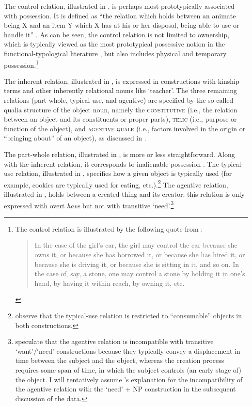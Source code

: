 \documentclass[output=paper,colorlinks,citecolor=brown]{langscibook}
\begin{document}
The control relation, illustrated in , is perhaps most prototypically associated with possession. It is defined as ``\label{ViknerJensen-control}the relation which holds between an animate being X and an item Y which X has at his or her disposal, being able to use or handle it'' \citep[196--197]{Vikner.Jensen2002}. As can be seen, the control relation is not limited to ownership, which is typically viewed as the most prototypical possessive notion in the functional-typological literature \citep[see, e.g.,][]{Heine1997}, but also includes physical and temporary possession.\footnote{The control relation is illustrated by the following quote from \citeauthor{Vikner.Jensen2002}:
\begin{quote}In the case of the girl's car, the girl may control the car because she owns it, or because she has borrowed it, or because she has hired it, or because she is driving it, or because she is sitting in it, and so on. In the case of, say, a stone, one may control a stone by holding it in one's hand, by having it within reach, by owning it, etc. \hfill  \citep[196--197]{Vikner.Jensen2002}
\end{quote}}

The inherent relation, illustrated in , is expressed in constructions with kinship terms and other inherently relational nouns like `teacher'. The three remaining relations (part-whole, typical-use, and agentive) are specified by the so-called qualia structure of the object noun, namely the \textsc{constitutive} (i.e., the relation between an object and its constituents or proper parts), \textsc{telic} (i.e., purpose or function of the object), and \textsc{agentive quale} (i.e., factors involved in the origin or ``bringing about'' of an object), as discussed in \citet{Pustejovsky1995}.

The part-whole relation, illustrated in , is more or less straightforward. Along with the inherent relation, it corresponds to inalienable possession \citep[see][]{Heine1997}. The typical-use relation, illustrated in , specifies how a given object is typically used (for example, cookies are typically used for eating, etc.).\footnote{\citet{Zaroukian.Beller2013} observe that the typical-use relation is restricted to ``consumable'' objects in both constructions.\label{footnote-cosummable}} The agentive relation, illustrated in , holds between a created thing and its creator; this relation is only expressed with overt \textit{have} but not with transitive `need'.\footnote{\citet{Zaroukian.Beller2013} speculate that the agentive relation is incompatible with transitive `want'/`need' constructions because they typically convey a displacement in time between the subject and the object, whereas the creation process requires some span of time, in which the subject controls (an early stage of) the object. I will tentatively assume \citeauthor{Zaroukian.Beller2013}'s explanation for the incompatibility of the agentive relation with the `need' + NP construction in the subsequent discussion of the  data.\label{footnote-agentive}}
\end{document}
